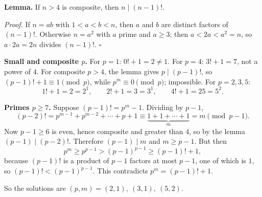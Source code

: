 \textbf{Lemma.} If $n>4$ is composite, then $n\mid(n-1)!$.

\emph{Proof.} If $n=ab$ with $1<a<b<n$, then $a$ and $b$ are distinct factors of $(n-1)!$. Otherwise $n=a^2$ with $a$ prime and $a\ge3$; then $a<2a<a^2=n$, so $a\cdot2a=2n$ divides $(n-1)!$. $\square$

\textbf{Small and composite $p$.} For $p=1$: $0!+1=2\ne1$. For $p=4$: $3!+1=7$, not a power of $4$. For composite $p>4$, the lemma gives $p\mid(p-1)!$, so $(p-1)!+1\equiv1\pmod p$, while $p^m\equiv0\pmod p$; impossible. For $p=2,3,5$:
\[1!+1=2=2^1,\qquad 2!+1=3=3^1,\qquad 4!+1=25=5^2.\]

\textbf{Primes $p\ge7$.} Suppose $(p-1)!=p^m-1$. Dividing by $p-1$,
\[(p-2)!=p^{m-1}+p^{m-2}+\cdots+p+1\equiv\underbrace{1+1+\cdots+1}_{m}=m\pmod{p-1}.\]
Now $p-1\ge6$ is even, hence composite and greater than $4$, so by the lemma $(p-1)\mid(p-2)!$. Therefore $(p-1)\mid m$ and $m\ge p-1$. But then
\[p^m\ge p^{p-1}>(p-1)^{p-1}\ge(p-1)!+1,\]
because $(p-1)!$ is a product of $p-1$ factors at most $p-1$, one of which is $1$, so $(p-1)!<(p-1)^{p-1}$. This contradicts $p^m=(p-1)!+1$.

So the solutions are $\boxed{(p,m)=(2,1),\ (3,1),\ (5,2)}$.
